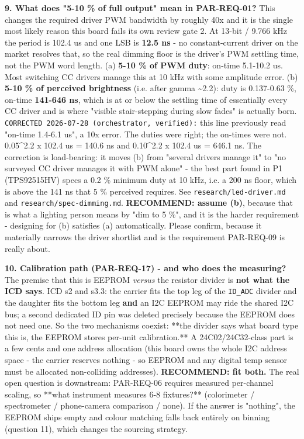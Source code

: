 \documentclass[11pt,a4paper]{article}
\begin{document}
\textbf{9. What does "5-10 \% of full output" mean in PAR-REQ-01?} This changes the required driver PWM bandwidth by roughly 40x and it is the single most likely reason this board fails its own review gate 2. At 13-bit / 9.766 kHz the period is 102.4 us and one LSB is \textbf{12.5 ns} - no constant-current driver on the market resolves that, so the real dimming floor is the driver's PWM settling time, not the PWM word length. (a) \textbf{5-10 \% of PWM duty}: on-time 5.1-10.2 us. Most switching CC drivers manage this at 10 kHz with some amplitude error. (b) \textbf{5-10 \% of perceived brightness} (i.e. after gamma \textasciitilde{}2.2): duty is 0.137-0.63 \%, on-time \textbf{141-646 ns}, which is at or below the settling time of essentially every CC driver and is where "visible stair-stepping during slow fades" is actually born. \texttt{CORRECTED 2026-07-28 (orchestrator, verified):} this line previously read "on-time 1.4-6.1 us", a 10x error. The duties were right; the on-times were not. 0.05\textasciicircum{}2.2 x 102.4 us = 140.6 ns and 0.10\textasciicircum{}2.2 x 102.4 us = 646.1 ns. The correction is load-bearing: it moves (b) from "several drivers manage it" to "no surveyed CC driver manages it with PWM alone" - the best part found in P1 (TPS92515HV) specs a 0.2 \% minimum duty at 10 kHz, i.e. a 200 ns floor, which is above the 141 ns that 5 \% perceived requires. See \texttt{research/led-driver.md} and \texttt{research/spec-dimming.md}. \textbf{RECOMMEND: assume (b)}, because that is what a lighting person means by "dim to 5 \%", and it is the harder requirement - designing for (b) satisfies (a) automatically. Please confirm, because it materially narrows the driver shortlist and is the requirement PAR-REQ-09 is really about.

\textbf{10. Calibration path (PAR-REQ-17) - and who does the measuring?} The premise that this is EEPROM \emph{versus} the resistor divider is \textbf{not what the ICD says}. ICD s2 and s3.3: the carrier fits the top leg of the \texttt{ID\_ADC} divider and the daughter fits the bottom leg \textbf{and} an I2C EEPROM may ride the shared I2C bus; a second dedicated ID pin was deleted precisely because the EEPROM does not need one. So the two mechanisms coexist: {*}{*}the divider says what board type this is, the EEPROM stores per-unit calibration.{*}{*} A 24C02/24C32-class part is a few cents and one address allocation (this board owns the whole I2C address space - the carrier reserves nothing - so EEPROM and any digital temp sensor must be allocated non-colliding addresses). \textbf{RECOMMEND: fit both.} The real open question is downstream: PAR-REQ-06 requires measured per-channel scaling, so {*}{*}what instrument measures 6-8 fixtures?{*}{*} (colorimeter / spectrometer / phone-camera comparison / none). If the answer is "nothing", the EEPROM ships empty and colour matching falls back entirely on binning (question 11), which changes the sourcing strategy.
\end{document}
